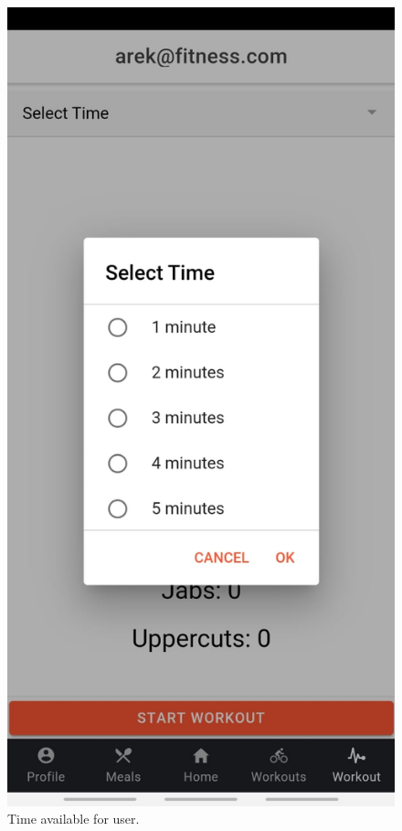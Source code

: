 \documentclass[a4paper,12pt]{report}
\begin{document}
\begin{figure}[ht]
\begin{minipage}[b]{0.5\linewidth}
    \includegraphics[width=.7\linewidth]{images/aplicationImages/timeSelection.jpeg} 
    \caption{Time available for user.} 
    \vspace{4ex}
  \end{minipage}%
  \begin{minipage}[b]{0.5\linewidth}
    \centering

\end{minipage}
\end{figure}
\end{document}
